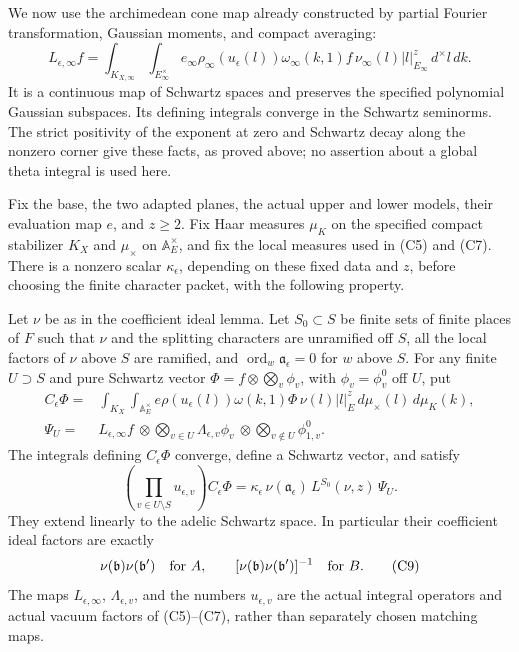We now use the archimedean cone map already constructed by partial
Fourier transformation, Gaussian moments, and compact averaging:
\[
 L_{\epsilon,\infty}f=
  \int_{K_{X,\infty}}\int_{E_\infty^\times}
 e_\infty\rho_\infty(u_\epsilon(l))\omega_\infty(k,1)f\,
             \nu_\infty(l)|l|_{E_\infty}^{z}\,d^\times l\,dk.
 \tag{C7}\label{eq:sr-cone-arch-operator-again}
\]
It is a continuous map of Schwartz spaces and preserves the specified
polynomial Gaussian subspaces. Its defining integrals converge in the
Schwartz seminorms. The strict positivity of the exponent at zero and
Schwartz decay along the nonzero corner give these facts, as proved
above; no assertion about a global theta integral is used here.

\begin{srproposition}
\label{prop:sr-cone-euler-factorization}
Fix the base, the two adapted planes, the actual upper and lower models,
their evaluation map \(e\), and \(z\ge2\). Fix Haar measures \(\mu_K\)
on the specified compact stabilizer \(K_X\) and \(\mu_\times\) on
\(\mathbb A_E^\times\), and fix the local measures used in (C5) and
(C7). There is a nonzero scalar \(\kappa_\epsilon\), depending on these
fixed data and \(z\), before choosing the finite character packet, with
the following property.

Let \(\nu\) be as in the coefficient ideal lemma. Let \(S_0\subset S\)
be finite sets of finite places of \(F\) such that \(\nu\) and the
splitting characters are unramified off \(S\), all the local factors
of \(\nu\) above \(S\) are ramified, and
\(\operatorname{ord}_w\mathfrak a_\epsilon=0\) for \(w\) above \(S\).
For any finite \(U\supset S\) and pure Schwartz vector
\(\Phi=f\otimes\bigotimes_v\phi_v\), with
\(\phi_v=\phi_v^0\) off \(U\), put
\[
 \begin{split}
 C_\epsilon\Phi={}&
 \int_{K_X}\int_{\mathbb A_E^\times}
 e\rho(u_\epsilon(l))\omega(k,1)\Phi\,
                  \nu(l)|l|_E^z\,d\mu_\times(l)\,d\mu_K(k),\\
 \Psi_U={}& L_{\epsilon,\infty}f\ \otimes
        \bigotimes_{v\in U}\Lambda_{\epsilon,v}\phi_v
              \ \otimes\bigotimes_{v\notin U}\phi_{1,v}^0.
 \end{split}
\]
The integrals defining \(C_\epsilon\Phi\) converge, define a Schwartz
vector, and satisfy
\[
 \left(\prod_{v\in U\setminus S}u_{\epsilon,v}\right)
                 C_\epsilon\Phi
   =\kappa_\epsilon\,\nu(\mathfrak a_\epsilon)\,
                      L^{S_0}(\nu,z)\,\Psi_U.
 \tag{C8}\label{eq:sr-cone-global-factorization}
\]
They extend linearly to the adelic Schwartz space. In particular their
coefficient ideal factors are exactly
\[
 \nu(\mathfrak b)\nu(\mathfrak b')\quad\hbox{for \(A\)},\qquad
 [\nu(\mathfrak b)\nu(\mathfrak b')]^{-1}
                  \quad\hbox{for \(B\)}.
 \tag{C9}\label{eq:sr-cone-fixed-ideal-exponents}
\]
The maps \(L_{\epsilon,\infty}\), \(\Lambda_{\epsilon,v}\), and the
numbers \(u_{\epsilon,v}\) are the actual integral operators and actual
vacuum factors of (C5)--(C7), rather than separately chosen matching
maps.
\end{srproposition}

